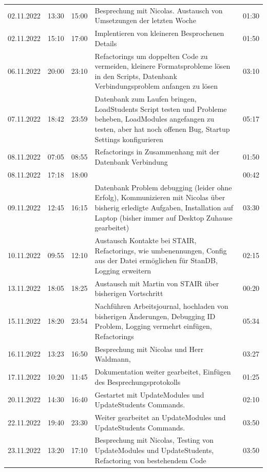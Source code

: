 \documentclass[a4paper, table]{article}
\begin{document}
\begin{longtable}[h]{|l|l|l|p{20em}|l|}
    02.11.2022 & 13:30 & 15:00 & Besprechung mit Nicolas. Austausch von   Umsetzungen der letzten Woche & 01:30 \\
    02.11.2022 & 15:10 & 17:00 & Implentieren von kleineren Besprochenen Details & 01:50 \\
    06.11.2022 & 20:00 & 23:10 & Refactorings um doppelten Code zu vermeiden,   kleinere Formatsprobleme lösen in den Scripts, Datenbank Verbindungsproblem   anfangen zu lösen & 03:10 \\
    07.11.2022 & 18:42 & 23:59 & Datenbank zum Laufen bringen, LoadStudents Script   testen und Probleme beheben, LoadModules angefangen zu testen, aber hat noch   offenen Bug, Startup Settings konfigurieren & 05:17 \\
    08.11.2022 & 07:05 & 08:55 & Refactorings in Zusammenhang mit der Datenbank   Verbindung & 01:50 \\
    08.11.2022 & 17:18 & 18:00 &  & 00:42 \\
    09.11.2022 & 12:45 & 16:15 & Datenbank Problem debugging (leider ohne Erfolg),   Kommunizieren mit Nicolas über bisherig erledigte Aufgaben, Installation auf   Laptop (bisher immer auf Desktop Zuhause gearbeitet) & 03:30 \\
    10.11.2022 & 09:55 & 12:10 & Austausch Kontakte bei STAIR, Refactorings, wie   umbenennungen, Config aus der Datei ermöglichen für StanDB, Logging erweitern & 02:15 \\
    13.11.2022 & 18:05 & 18:25 & Austausch mit Martin von STAIR über bisherigen   Vortschritt & 00:20 \\
    15.11.2022 & 18:20 & 23:54 & Nachführen Arbeitsjournal, hochladen von   bisherigen Änderungen, Debugging ID Problem, Logging vermehrt einfügen,   Refactorings & 05:34 \\
    16.11.2022 & 13:23 & 16:50 & Besprechung mit Nicolas und Herr Waldmann, & 03:27 \\
    17.11.2022 & 10:20 & 11:45 & Dokumentation weiter gearbeitet, Einfügen des   Besprechungsprotokolls & 01:25 \\
    20.11.2022 & 14:30 & 16:40 & Gestartet mit   UpdateModules und UpdateStudents Commands. & 02:10 \\
    22.11.2022 & 19:40 & 23:30 & Weiter gearbeitet an UpdateModules und   UpdateStudents Commands. & 03:50 \\
    23.11.2022 & 13:20 & 17:10 & Besprechung mit Nicolas, Testing von   UpdateModules und UpdateStudents, Refactoring von bestehendem Code & 03:50 \\

\end{longtable}
\end{document}
